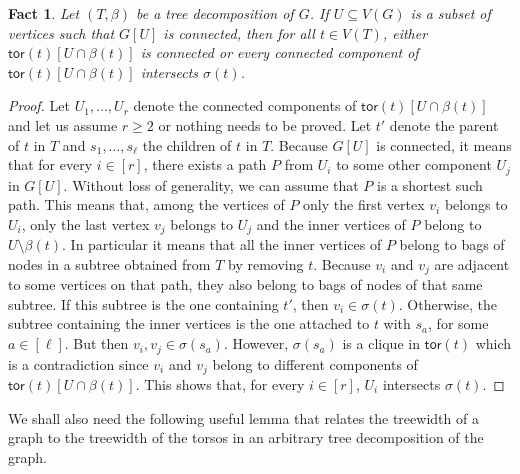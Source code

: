 \documentclass[a4paper,11pt]{article}
\numberwithin{lemma}{section}
\newtheorem{fact}[lemma]{Fact}
\newcommand{\tor}{\mathsf{tor}}
\begin{document}
\begin{fact}\label{fact-connintorso}
 Let $(T,\beta)$ be a tree decomposition of $G$.
 If $U \subseteq V(G)$ is a subset of vertices such that $G[U]$ is connected, then for all $t \in V(T)$, either $\tor(t)[U \cap \beta(t)]$ is connected or every connected component of $\tor(t)[U \cap \beta(t)]$ intersects $\sigma(t)$.
\end{fact}

\begin{proof}
 Let $U_1, \dots, U_r$ denote the connected components of $\tor(t)[U \cap \beta(t)]$ and let us assume $r \geq 2$ or nothing needs to be proved.
 Let $t'$ denote the parent of $t$ in $T$ and $s_1, \dots, s_\ell$ the children of $t$ in $T$.
 Because $G[U]$ is connected, it means that for every $i \in [r]$, there exists a path $P$ from $U_i$ to some other component $U_j$ in $G[U]$.
 Without loss of generality, we can assume that $P$ is a shortest such path.
 This means that, among the vertices of $P$ only the first vertex $v_i$ belongs to $U_i$, only the last vertex $v_j$ belongs to $U_j$ and the inner vertices of $P$ belong to $U \setminus \beta(t)$.
 In particular it means that all the inner vertices of $P$ belong to bags of nodes in a subtree obtained from $T$ by removing $t$.
 Because $v_i$ and $v_j$ are adjacent to some vertices on that path, they also belong to bags of nodes of that same subtree.
 If this subtree is the one containing $t'$, then $v_i \in \sigma(t)$.
 Otherwise, the subtree containing the inner vertices is the one attached to $t$ with $s_a$, for some $a \in [\ell]$.
 But then $v_i,v_j \in \sigma(s_a)$.
 However, $\sigma(s_a)$ is a clique in $\tor(t)$ which is a contradiction since $v_i$ and $v_j$ belong to different components of $\tor(t)[U \cap \beta(t)]$.
 This shows that, for every $i \in [r]$, $U_i$ intersects $\sigma(t)$.
\end{proof}

We shall also need the following useful lemma that relates the treewidth of a graph to the treewidth of the torsos in an arbitrary tree decomposition of the graph.
\end{document}
